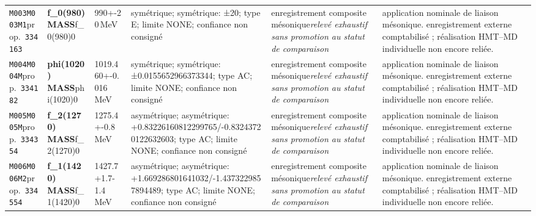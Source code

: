 \begin{landscape}
\begin{longtable}{L{1.85cm}L{4.45cm}L{2.35cm}L{4.05cm}L{3.35cm}L{7.15cm}}
\texttt{M003}\newline \texttt{M003M1}\newline prop.\ \texttt{334163} & \textbf{f\_\allowbreak{}0(980) MASS}\newline f\_\allowbreak{}0(980)0 & 990+-20\,MeV & symétrique; symétrique: ±20; type E; limite NONE; confiance non consigné & enregistrement composite mésonique\newline \emph{relevé exhaustif sans promotion au statut de comparaison} & application nominale de liaison mésonique. enregistrement externe comptabilisé ; réalisation HMT--MD individuelle non encore reliée. \\
\texttt{M004}\newline \texttt{M004M}\newline prop.\ \texttt{334182} & \textbf{phi(1020) MASS}\newline phi(1020)0 & 1019.460+-0.016\,MeV & symétrique; symétrique: ±0.0155652966373344; type AC; limite NONE; confiance non consigné & enregistrement composite mésonique\newline \emph{relevé exhaustif sans promotion au statut de comparaison} & application nominale de liaison mésonique. enregistrement externe comptabilisé ; réalisation HMT--MD individuelle non encore reliée. \\
\texttt{M005}\newline \texttt{M005M}\newline prop.\ \texttt{334354} & \textbf{f\_\allowbreak{}2(1270) MASS}\newline f\_\allowbreak{}2(1270)0 & 1275.4+-0.8\,MeV & asymétrique; asymétrique: +0.83226160812299765/-0.83243720122632603; type AC; limite NONE; confiance non consigné & enregistrement composite mésonique\newline \emph{relevé exhaustif sans promotion au statut de comparaison} & application nominale de liaison mésonique. enregistrement externe comptabilisé ; réalisation HMT--MD individuelle non encore reliée. \\
\texttt{M006}\newline \texttt{M006M2}\newline prop.\ \texttt{334554} & \textbf{f\_\allowbreak{}1(1420) MASS}\newline f\_\allowbreak{}1(1420)0 & 1427.7+1.7-1.4\,MeV & asymétrique; asymétrique: +1.669286801641032/-1.4373229857894489; type AC; limite NONE; confiance non consigné & enregistrement composite mésonique\newline \emph{relevé exhaustif sans promotion au statut de comparaison} & application nominale de liaison mésonique. enregistrement externe comptabilisé ; réalisation HMT--MD individuelle non encore reliée. \\

\end{longtable}
\end{landscape}
